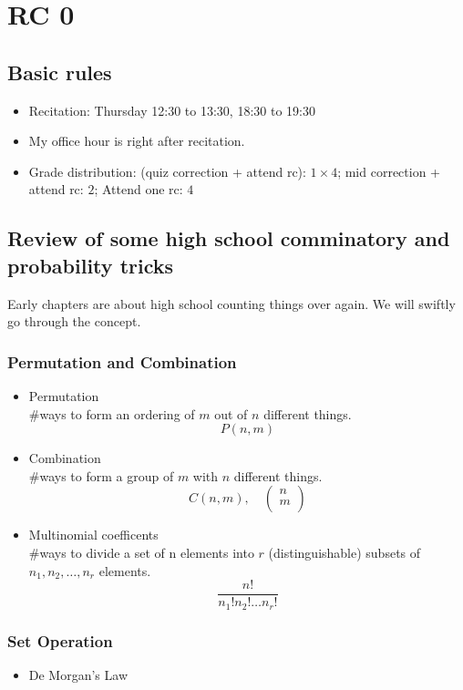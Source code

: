 \chapter{RC 0}
\section{Basic rules}
\begin{itemize}
    \item Recitation: Thursday 12:30 to 13:30, 18:30 to 19:30
    \item My office hour is right after recitation.
    \item Grade distribution: (quiz correction + attend rc): $1\times 4$; mid correction + attend rc:  $2$; Attend one rc: $4$ 
\end{itemize}
\section{Review of some high school comminatory and probability tricks}
Early chapters are about high school counting things over again.
We will swiftly go through the concept.  
\subsection{Permutation and Combination}
\begin{itemize}
    \item Permutation\\
		\#ways to form an ordering of \(m\) out of \(n\) different things. 
	\[
		P(n,m)
	\]
    \item Combination\\
		\#ways to form a group of \(m\) with \(n\) different things.
	\[
		C(n,m),\quad \begin{pmatrix}
			 n \\
			 m \\
		\end{pmatrix}
	\]
    \item Multinomial coefficents \cite*{Gravner2021}\\
		\#ways to divide a set of n elements into \(r\) (distinguishable) subsets of \(n_1, n_2 , \dots, n_r \) elements.
		\[
			\frac{n!}{n_1! n_2! \dots n_r!}
		\]
\end{itemize}
\subsection{Set Operation}
\begin{itemize}
    \item De Morgan's Law
\end{itemize}
